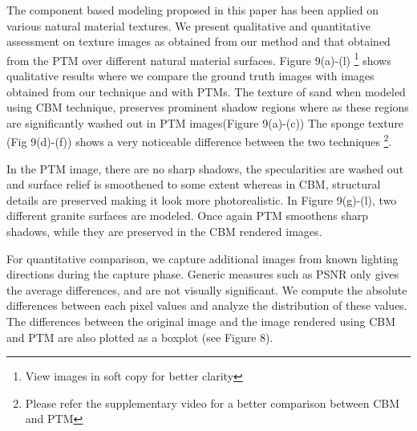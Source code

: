 The component based modeling proposed in this paper has been applied on various
natural material textures. We present qualitative and quantitative assessment on
texture images as obtained from our method and that obtained from the PTM over
different natural material surfaces. Figure 9(a)-(l) \footnote{View images in
soft copy for better clarity} shows qualitative results where we compare the
ground truth images with images obtained from our technique and with PTMs. The
texture of sand when modeled using CBM technique, preserves prominent shadow
regions where as these regions are significantly washed out in PTM images(Figure
9(a)-(c)) The sponge texture (Fig 9(d)-(f)) shows a very noticeable difference
between the two techniques \footnote{Please refer the supplementary video for a
better comparison between CBM and PTM}.

In the PTM image, there are no sharp shadows, the specularities are washed out
and surface relief is smoothened to some extent whereas in CBM, structural
details are preserved making it look more photorealistic. In Figure 9(g)-(l),
two different granite surfaces are modeled. Once again PTM smoothens sharp
shadows, while they are preserved in the CBM rendered images.

For quantitative comparison, we capture additional images from known lighting
directions during the capture phase. Generic measures such as PSNR only gives
the average differences, and are not visually significant. We compute the
absolute differences between each pixel values and analyze the distribution of
these values. The differences between the original image and the image rendered
using CBM and PTM are also plotted as a boxplot (see Figure 8).


